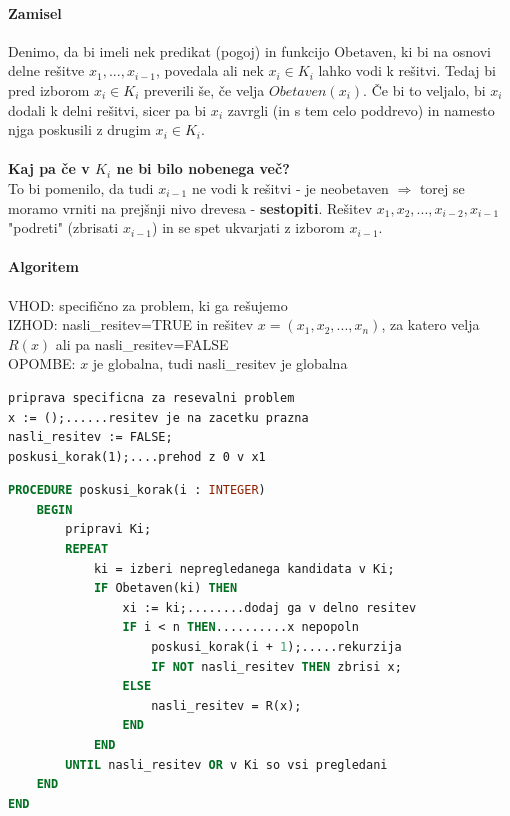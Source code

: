 \documentclass[a4paper,10pt]{article}
\begin{document}
\paragraph{Zamisel}
Denimo, da bi imeli nek predikat (pogoj) in funkcijo Obetaven, ki bi na osnovi delne re\v sitve $x_1,..., x_{i-1}$, povedala ali nek $x_i \in K_i$ lahko vodi k re\v sitvi. Tedaj bi pred izborom $x_i \in K_i$ preverili \v se, \v ce velja $Obetaven(x_i)$. \v Ce bi to veljalo, bi $x_i$ dodali k delni re\v sitvi, sicer pa bi $x_i$ zavrgli (in s tem celo poddrevo) in namesto njga poskusili z drugim $x_i \in K_i$.\\
\\
\textbf{Kaj pa \v ce v $K_i$ ne bi bilo nobenega ve\v c?}\\
To bi pomenilo, da tudi $x_{i-1}$ ne vodi k re\v sitvi - je neobetaven $\Rightarrow$ torej se moramo vrniti na prej\v snji nivo drevesa - \textbf{sestopiti}. Re\v sitev $x_1, x_2,..., x_{i-2}, x_{i-1}$ "podreti" (zbrisati $x_{i-1}$) in se spet ukvarjati z izborom $x_{i-1}$.

\paragraph{Algoritem}
\begin{flushleft}
VHOD: specifi\v cno za problem, ki ga re\v sujemo\\
IZHOD: nasli\_resitev=TRUE in re\v sitev $x=(x_1, x_2,..., x_n)$, za katero velja $R(x)$ ali pa nasli\_resitev=FALSE\\
OPOMBE: $x$ je globalna, tudi nasli\_resitev je globalna
\end{flushleft}
\begin{lstlisting}
priprava specificna za resevalni problem
x := ();......resitev je na zacetku prazna
nasli_resitev := FALSE;
poskusi_korak(1);....prehod z 0 v x1
\end{lstlisting}

\begin{lstlisting}[language=Pascal,caption={Primer izbolj\v sane psevdokode za sestopanje}]
PROCEDURE poskusi_korak(i : INTEGER)
    BEGIN
        pripravi Ki;
        REPEAT
            ki = izberi nepregledanega kandidata v Ki;
            IF Obetaven(ki) THEN
                xi := ki;........dodaj ga v delno resitev
                IF i < n THEN..........x nepopoln
                    poskusi_korak(i + 1);.....rekurzija
                    IF NOT nasli_resitev THEN zbrisi x;
                ELSE
                    nasli_resitev = R(x);
                END
            END
        UNTIL nasli_resitev OR v Ki so vsi pregledani
    END
END
\end{lstlisting}
\end{document}

